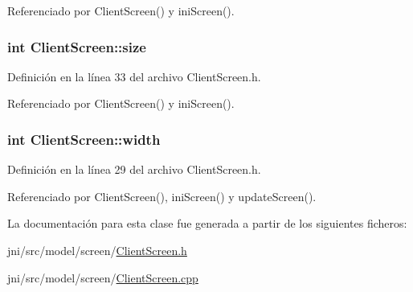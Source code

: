 Referenciado por Client\-Screen() y ini\-Screen().

\hypertarget{classClientScreen_acdc02740aa020f6b66a933213e0bec7e}{
\subsubsection[{size}]{\setlength{\rightskip}{0pt plus 5cm}int Client\-Screen\-::size\hspace{0.3cm}{\ttfamily [private]}}}\label{classClientScreen_acdc02740aa020f6b66a933213e0bec7e}


Definición en la línea 33 del archivo Client\-Screen.\-h.



Referenciado por Client\-Screen() y ini\-Screen().

\hypertarget{classClientScreen_ac6f888c59861f6cca2f0ed9ea2c6b81b}{
\subsubsection[{width}]{\setlength{\rightskip}{0pt plus 5cm}int Client\-Screen\-::width\hspace{0.3cm}{\ttfamily [private]}}}\label{classClientScreen_ac6f888c59861f6cca2f0ed9ea2c6b81b}


Definición en la línea 29 del archivo Client\-Screen.\-h.



Referenciado por Client\-Screen(), ini\-Screen() y update\-Screen().



La documentación para esta clase fue generada a partir de los siguientes ficheros\-:\begin{DoxyCompactItemize}
\item 
jni/src/model/screen/\hyperlink{ClientScreen_8h}{Client\-Screen.\-h}\item 
jni/src/model/screen/\hyperlink{ClientScreen_8cpp}{Client\-Screen.\-cpp}\end{DoxyCompactItemize}

